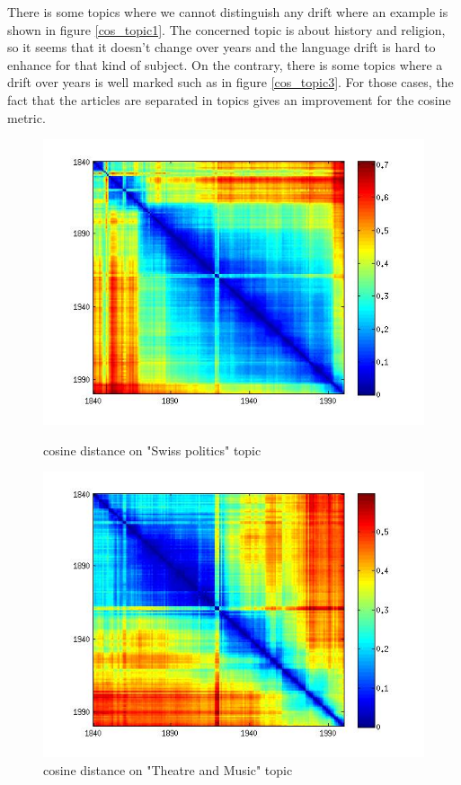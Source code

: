 There is some topics where we cannot distinguish any drift where an example is shown in figure \ref{cos_topic1}. The concerned topic is about history and religion, so it seems that it doesn't change over years and the language drift is hard to enhance for that kind of subject. On the contrary, there is some topics where a drift over years is well marked such as in figure \ref{cos_topic3}. For those cases, the fact that the articles are separated in topics gives an improvement for the cosine metric.

\begin{figure}[H]
    \begin{minipage}[b]{0.48\linewidth}
        \includegraphics[scale=0.3]{Pictures/topics/cos/topic7.jpg}
        \caption{cosine distance on "Swiss politics" topic}
        \label{cos_topic7}
    \end{minipage}\hfill
    \begin{minipage}[b]{0.5\linewidth}
        \includegraphics[scale=0.3]{Pictures/topics/cos/topic9.jpg}
        \caption{cosine distance on "Theatre and Music" topic}
        \label{cos_topic9}
    \end{minipage}\hfill
\end{figure}

